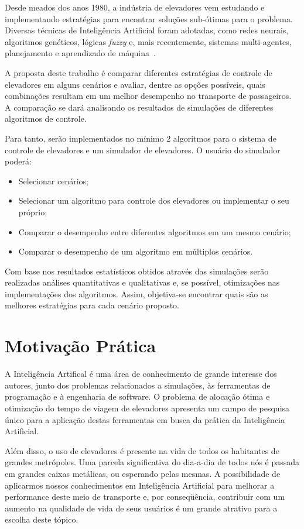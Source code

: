 Desde meados dos anos 1980, a indústria de elevadores vem estudando e implementando estratégias para encontrar soluções sub-ótimas para o problema. Diversas técnicas de Inteligência Artificial foram adotadas, como redes neurais, algoritmos genéticos, lógicas \textit{fuzzy} e, mais recentemente, sistemas multi-agentes, planejamento e aprendizado de máquina~\cite{KOEHLEROTTIGER02}.

A proposta deste trabalho é comparar diferentes estratégias de controle de elevadores em alguns cenários e avaliar, dentre as opções possíveis, quais combinações resultam em um melhor desempenho no transporte de passageiros. A comparação se dará analisando os resultados de simulações de diferentes algoritmos de controle.

Para tanto, serão implementados no mínimo 2 algoritmos para o sistema de controle de elevadores e um simulador de elevadores. O usuário do simulador poderá:

\begin{itemize}
  \item Selecionar cenários;
  \item Selecionar um algoritmo para controle dos elevadores ou implementar o seu próprio;
  \item Comparar o desempenho entre diferentes algoritmos em um mesmo cenário;
  \item Comparar o desempenho de um algoritmo em múltiplos cenários.
\end{itemize}

Com base nos resultados estatísticos obtidos através das simulações serão realizadas análises quantitativas e qualitativas e, se possível, otimizações nas implementações dos algoritmos. Assim, objetiva-se encontrar quais são as melhores estratégias para cada cenário proposto.

\section{Motivação Prática}
A Inteligência Artifical é uma área de conhecimento de grande interesse dos autores, junto dos problemas relacionados a simulações, às ferramentas de programação e à engenharia de software. O problema de alocação ótima e otimização do tempo de viagem de elevadores apresenta um campo de pesquisa único para a aplicação destas ferramentas em busca da prática da Inteligência Artificial.

Além disso, o uso de elevadores é presente na vida de todos os habitantes de grandes metrópoles. Uma parcela significativa do dia-a-dia de todos nós é passada em grandes caixas metálicas, ou esperando pelas mesmas. A possibilidade de aplicarmos nossos conhecimentos em Inteligência Artificial para melhorar a performance deste meio de transporte e, por conseqüência, contribuir com um aumento na qualidade de vida de seus usuários é um grande atrativo para a escolha deste tópico.

